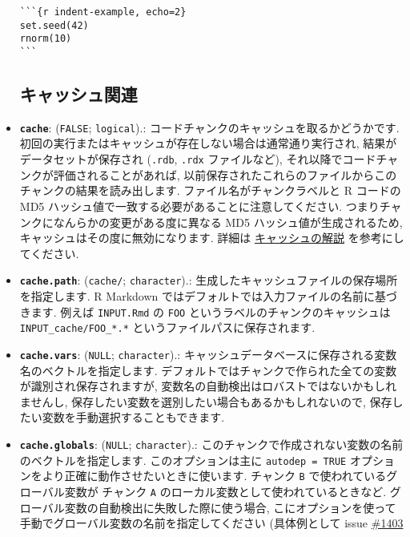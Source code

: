 \documentclass[
  lualatex,ja=standard,jafont=noto-otf]{bxjsreport}
\begin{document}
\begin{itemize}
\begin{verbatim}
```{r indent-example, echo=2}
set.seed(42)
rnorm(10)
```
\end{verbatim}

  \hypertarget{options-cache}{%
  \subsection{キャッシュ関連}\label{options-cache}}
\item
  \textbf{\texttt{cache}}: (\texttt{FALSE}; \texttt{logical}).:
  コードチャンクのキャッシュを取るかどうかです.
  初回の実行またはキャッシュが存在しない場合は通常通り実行され,
  結果がデータセットが保存され (\texttt{.rdb}, \texttt{.rdx}
  ファイルなど), それ以降でコードチャンクが評価されることがあれば,
  以前保存されたこれらのファイルからこのチャンクの結果を読み出します.
  ファイル名がチャンクラベルと R コードの MD5
  ハッシュ値で一致する必要があることに注意してください.
  つまりチャンクになんらかの変更がある度に異なる MD5
  ハッシュ値が生成されるため, キャッシュはその度に無効になります. 詳細は
  \protect\hyperlink{cache}{キャッシュの解説} を参考にしてください.
\item
  \textbf{\texttt{cache.path}}:
  (\texttt{\textquotesingle{}cache/\textquotesingle{}};
  \texttt{character}).:
  生成したキャッシュファイルの保存場所を指定します. R Markdown
  ではデフォルトでは入力ファイルの名前に基づきます. 例えば
  \texttt{INPUT.Rmd} の \texttt{FOO}
  というラベルのチャンクのキャッシュは \texttt{INPUT\_cache/FOO\_*.*}
  というファイルパスに保存されます.
\item
  \textbf{\texttt{cache.vars}}: (\texttt{NULL}; \texttt{character}).:
  キャッシュデータベースに保存される変数名のベクトルを指定します.
  デフォルトではチャンクで作られた全ての変数が識別され保存されますが,
  変数名の自動検出はロバストではないかもしれませんし,
  保存したい変数を選別したい場合もあるかもしれないので,
  保存したい変数を手動選択することもできます.
\item
  \textbf{\texttt{cache.globals}}: (\texttt{NULL}; \texttt{character}).:
  このチャンクで作成されない変数の名前のベクトルを指定します.
  このオプションは主に \texttt{autodep\ =\ TRUE}
  オプションをより正確に動作させたいときに使います. チャンク \texttt{B}
  で使われているグローバル変数が チャンク \texttt{A}
  のローカル変数として使われているときなど.
  グローバル変数の自動検出に失敗した際に使う場合,
  こにオプションを使って手動でグローバル変数の名前を指定してください
  (具体例として issue
  \href{https://github.com/yihui/knitr/issues/1403}{\#1403}

\end{itemize}
\end{document}

